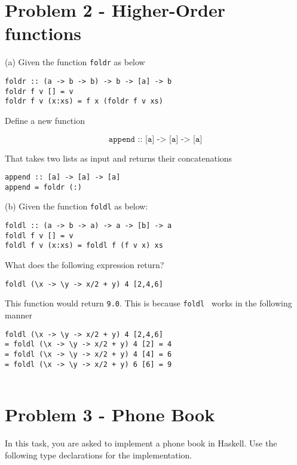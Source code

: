 \documentclass{article}
\begin{document}
    \section{Problem 2 - Higher-Order functions}

    (a) Given the function \texttt{foldr} as below

    \begin{lstlisting}
foldr :: (a -> b -> b) -> b -> [a] -> b 
foldr f v [] = v
foldr f v (x:xs) = f x (foldr f v xs)
    \end{lstlisting}

    Define a new function

    \[ \texttt{append :: [a] -> [a] -> [a]} \]

    That takes two lists as input and returns their concatenations

    \begin{ans}
        \hspace{1em}
        \begin{lstlisting}
append :: [a] -> [a] -> [a]
append = foldr (:)
        \end{lstlisting}
    \end{ans}

    (b) Given the function \texttt{foldl} as below:
            
    \begin{lstlisting}
foldl :: (a -> b -> a) -> a -> [b] -> a 
foldl f v [] = v
foldl f v (x:xs) = foldl f (f v x) xs
    \end{lstlisting}

    What does the following expression return?

    \begin{lstlisting}
foldl (\x -> \y -> x/2 + y) 4 [2,4,6]
    \end{lstlisting}

    \begin{ans}
        This function would return \texttt{9.0}. This is because \texttt{foldl } works in the following manner 

        \begin{lstlisting}
foldl (\x -> \y -> x/2 + y) 4 [2,4,6]
= foldl (\x -> \y -> x/2 + y) 4 [2] = 4
= foldl (\x -> \y -> x/2 + y) 4 [4] = 6
= foldl (\x -> \y -> x/2 + y) 6 [6] = 9
        
        \end{lstlisting}
    \end{ans}

    \section{Problem 3 - Phone Book}
    In this task, you are asked to implement a phone book in Haskell. Use the following type declarations for the implementation.
\end{document}
